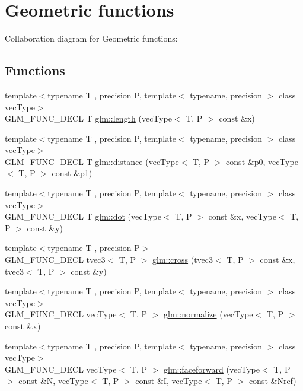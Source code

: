 \hypertarget{group__core__func__geometric}{\section{Geometric functions}
\label{group__core__func__geometric}
}
Collaboration diagram for Geometric functions\-:
\subsection*{Functions}
\begin{DoxyCompactItemize}
\item 
{\footnotesize template$<$typename T , precision P, template$<$ typename, precision $>$ class vec\-Type$>$ }\\G\-L\-M\-\_\-\-F\-U\-N\-C\-\_\-\-D\-E\-C\-L T \hyperlink{group__core__func__geometric_ga18d45e3d4c7705e67ccfabd99e521604}{glm\-::length} (vec\-Type$<$ T, P $>$ const \&x)
\item 
{\footnotesize template$<$typename T , precision P, template$<$ typename, precision $>$ class vec\-Type$>$ }\\G\-L\-M\-\_\-\-F\-U\-N\-C\-\_\-\-D\-E\-C\-L T \hyperlink{group__core__func__geometric_ga7ca317dde0d7e94d920153554d4a02a8}{glm\-::distance} (vec\-Type$<$ T, P $>$ const \&p0, vec\-Type$<$ T, P $>$ const \&p1)
\item 
{\footnotesize template$<$typename T , precision P, template$<$ typename, precision $>$ class vec\-Type$>$ }\\G\-L\-M\-\_\-\-F\-U\-N\-C\-\_\-\-D\-E\-C\-L T \hyperlink{group__core__func__geometric_ga7dada304da2ba7dd3376ab4f178c3f6b}{glm\-::dot} (vec\-Type$<$ T, P $>$ const \&x, vec\-Type$<$ T, P $>$ const \&y)
\item 
{\footnotesize template$<$typename T , precision P$>$ }\\G\-L\-M\-\_\-\-F\-U\-N\-C\-\_\-\-D\-E\-C\-L tvec3$<$ T, P $>$ \hyperlink{group__core__func__geometric_gafe2cae8cb26fd44be62aee97369d0af8}{glm\-::cross} (tvec3$<$ T, P $>$ const \&x, tvec3$<$ T, P $>$ const \&y)
\item 
{\footnotesize template$<$typename T , precision P, template$<$ typename, precision $>$ class vec\-Type$>$ }\\G\-L\-M\-\_\-\-F\-U\-N\-C\-\_\-\-D\-E\-C\-L vec\-Type$<$ T, P $>$ \hyperlink{group__core__func__geometric_gada9451ec170a36fe53552812b9c03a68}{glm\-::normalize} (vec\-Type$<$ T, P $>$ const \&x)
\item 
{\footnotesize template$<$typename T , precision P, template$<$ typename, precision $>$ class vec\-Type$>$ }\\G\-L\-M\-\_\-\-F\-U\-N\-C\-\_\-\-D\-E\-C\-L vec\-Type$<$ T, P $>$ \hyperlink{group__core__func__geometric_gaea854e5aec1b5839832ac2dfc7cd3c0d}{glm\-::faceforward} (vec\-Type$<$ T, P $>$ const \&N, vec\-Type$<$ T, P $>$ const \&I, vec\-Type$<$ T, P $>$ const \&Nref)

\end{DoxyCompactItemize}

